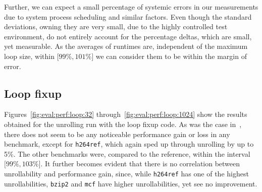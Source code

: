 Further, we can expect a small percentage of systemic errors in our measurements due to system process scheduling and similar factors.
Even though the standard deviations, owning they are very small, due to the highly controlled test environment, do not entirely account for the percentage deltas, which are small, yet measurable.
As the averages of runtimes are, independent of the maximum loop size, within $\lbrack 99\%, 101\% \rbrack$ we can consider them to be within the margin of error.

\subsection{Loop fixup}\label{sec:eval:perf:loop}

Figures~\ref{fig:eval:perf:loop:32} through~\ref{fig:eval:perf:loop:1024} show the results obtained for the unrolling run with the loop fixup code.
As was the case in~, there does not seem to be any noticeable performance gain or loss in any benchmark, except for \texttt{h264ref}, which again sped up through unrolling by up to 5\%.
The other benchmarks were, compared to the reference, within the interval $\lbrack 99\%, 103\% \rbrack$.
It further becomes evident that there is no correlation between unrollability and performance gain, since, while \texttt{h264ref} has one of the highest unrollabilities, \texttt{bzip2} and \texttt{mcf} have higher unrollabilities, yet see no improvement.




